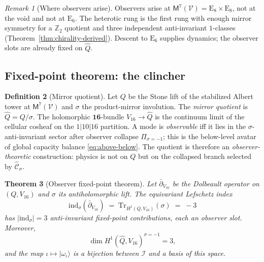\documentclass[11pt]{article}
\theoremstyle{plain}
\newtheorem{theorem}{Theorem}[section]
\theoremstyle{definition}
\newtheorem{definition}[theorem]{Definition}
\theoremstyle{remark}
\newtheorem{remark}[theorem]{Remark}
\numberwithin{equation}{section}
\newcommand{\E}[1]{\mathrm{E}_{#1}}
\newcommand{\Void}{\mathcal{V}}
\newcommand{\Mirror}{\mathsf{M}}
\begin{document}
\begin{remark}[Where observers arise]
Observers arise at $\Mirror^7(\Void)=\E{8}\times\E{8}$, not at the void and
not at $\E{6}$. The heterotic rung is the first rung with enough mirror
symmetry for a $\mathbb{Z}_2$ quotient and three independent anti-invariant
$1$-classes (Theorem~\ref{thm:chirality-derived}). Descent to $\E{6}$ supplies
dynamics; the observer slots are already fixed on $\hat Q$.
\end{remark}

\subsection{Fixed-point theorem: the clincher}
\label{sec:observer:fixed-point}

\begin{definition}[Mirror quotient]\label{def:Qhat}
Let $Q$ be the Stone lift of the stabilized Albert tower at
$\Mirror^7(\Void)$ and $\sigma$ the product-mirror involution. The
\emph{mirror quotient} is $\hat Q=Q/\sigma$. The holomorphic
$\mathbf{16}$-bundle $V_{16}\to\hat Q$ is the continuum limit of the
cellular cosheaf on the $1|10|16$ partition. A mode is \emph{observable}
iff it lies in the $\sigma$-anti-invariant sector after observer collapse
$\Pi_{\sigma=-1}$; this is the below-level avatar of global capacity balance
\eqref{eq:above-below}. The quotient is therefore an \emph{observer-theoretic}
construction: physics is not on $Q$ but on the collapsed branch selected by
$\hat{\mathcal{C}}_\sigma$.
\end{definition}

\begin{theorem}[Observer fixed-point theorem]\label{thm:observer-fp}
Let $\bar\partial_{V_{16}}$ be the Dolbeault operator on $(Q,V_{16})$ and
$\sigma$ its antiholomorphic lift. The equivariant Lefschetz index
\begin{equation}\label{eq:lefschetz}
  \mathrm{ind}_\sigma(\bar\partial_{V_{16}})
  \;=\;
  \mathrm{Tr}_{H^1(Q,V_{16})}(\sigma)
  \;=\; -3
\end{equation}
has $|\mathrm{ind}_\sigma|=3$ anti-invariant fixed-point contributions, each
an observer slot. Moreover,
\begin{equation}\label{eq:h1-observer}
  \dim H^1(\hat Q,V_{16})^{\sigma=-1}=3,
\end{equation}
and the map $\iota\mapsto|\omega_\iota\rangle$ is a bijection between
$\mathcal{I}$ and a basis of this space.
\end{theorem}
\end{document}
